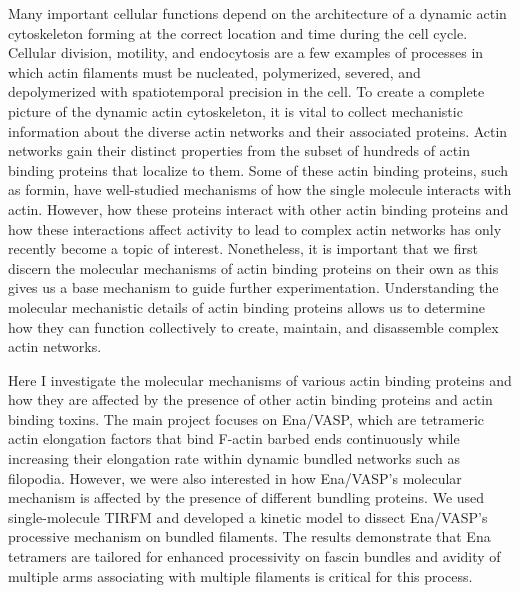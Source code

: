 \abstract
Many important cellular functions depend on the architecture of a dynamic actin cytoskeleton forming at the correct location and time during the cell cycle. Cellular division, motility, and endocytosis are a few examples of processes in which actin filaments must be nucleated, polymerized, severed, and depolymerized with spatiotemporal precision in the cell. To create a complete picture of the dynamic actin cytoskeleton, it is vital to collect mechanistic information about the diverse actin networks and their associated proteins. Actin networks gain their distinct properties from the subset of hundreds of actin binding proteins that localize to them. Some of these actin binding proteins, such as formin, have well-studied mechanisms of how the single molecule interacts with actin. However, how these proteins interact with other actin binding proteins and how these interactions affect activity to lead to complex actin networks has only recently become a topic of interest. Nonetheless, it is important that we first discern the molecular mechanisms of actin binding proteins on their own as this gives us a base mechanism to guide further experimentation. Understanding the molecular mechanistic details of actin binding proteins allows us to determine how they can function collectively to create, maintain, and disassemble complex actin networks. 

Here I investigate the molecular mechanisms of various actin binding proteins and how they are affected by the presence of other actin binding proteins and actin binding toxins. The main project focuses on Ena/VASP, which are tetrameric actin elongation factors that bind F-actin barbed ends continuously while increasing their elongation rate within dynamic bundled networks such as filopodia. However, we were also interested in how Ena/VASP's molecular mechanism is affected by the presence of different bundling proteins. We used single-molecule TIRFM and developed a kinetic model to dissect Ena/VASP’s processive mechanism on bundled filaments. The results demonstrate that Ena tetramers are tailored for enhanced processivity on fascin bundles and avidity of multiple arms associating with multiple filaments is critical for this process. 

